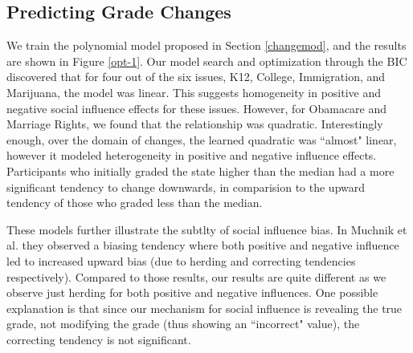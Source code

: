 \subsection{Predicting Grade Changes}
We train the polynomial model proposed in Section \ref{changemod}, and the results are shown in Figure \ref{opt-1}.
Our model search and optimization through the BIC discovered that for four out of the six issues, K12, College, Immigration, and Marijuana, the model was linear.
This suggests homogeneity in positive and negative social influence effects for these issues.
However, for Obamacare and Marriage Rights, we found that the relationship was quadratic.
Interestingly enough, over the domain of changes, the learned quadratic was ``almost" linear, however it modeled heterogeneity in positive and negative influence effects.
Participants who initially graded the state higher than the median had a more significant tendency to change downwards, in comparision to the upward tendency of those who graded less than the median.

These models further illustrate the subtlty of social influence bias. 
In Muchnik et al. they observed a biasing tendency where both positive and negative influence led to increased upward bias (due to herding and correcting tendencies respectively).
Compared to those results, our results are quite different as we observe just herding for both positive and negative influences.
One possible explanation is that since our mechanism for social influence is revealing the true grade, not modifying the grade (thus showing an ``incorrect" value), the correcting tendency is not significant.





